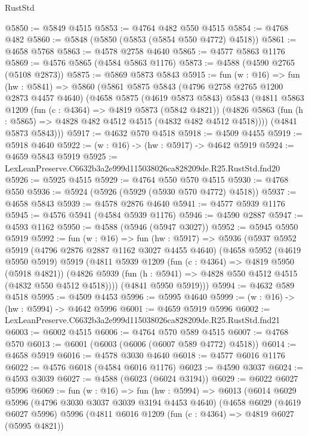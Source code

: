 \begin{lexlean}{RustStd}
\begin{coremodule}
@5850 := @5849 @4515
@5853 := @4764 @482 @550 @4515
@5854 := @4768 @482
@5860 := @5848 (@5850 (@5853 (@5854 @550 @4772) @4518))
@5861 := @4658 @5768
@5863 := @4578 @2758 @4640
@5865 := @4577 @5863 @1176
@5869 := @4576 @5865 (@4584 @5863 @1176)
@5873 := @4588 (@4590 @2765 (@5108 @2873))
@5875 := @5869 @5873 @5843
@5915 := fun (w : @16) =>
  fun (hw : @5841) =>
  @5860
    (@5861
      @5875
      @5843
      (@4796 @2758 @2765 @1200 @2873 @4457 @4640)
      (@4658
        @5875
        (@4619 @5873 @5843)
        @5843
        (@4811
          @5863
          @1209
          (fun (c : @4364) => @4819 @5873 (@5842 @4821))
          (@4826 @5863 (fun (h : @5865) => @4828 @482 @4512 @4515 (@4832 @482 @4512 @4518))))
        (@4841 @5873 @5843)))
@5917 := @4632 @570 @4518
@5918 := @4509 @4455
@5919 := @5918 @4640
@5922 := (w : @16) -> (hw : @5917) -> @4642 @5919
@5924 := @4659 @5843 @5919
@5925 := LexLeanPreserve.C6632b3a2e999d115038026ca828209de.R25.RustStd.fnd20
@5926 := @5925 @4515
@5929 := @4764 @550 @570 @4515
@5930 := @4768 @550
@5936 := @5924 (@5926 (@5929 (@5930 @570 @4772) @4518))
@5937 := @4658 @5843
@5939 := @4578 @2876 @4640
@5941 := @4577 @5939 @1176
@5945 := @4576 @5941 (@4584 @5939 @1176)
@5946 := @4590 @2887
@5947 := @4593 @1162
@5950 := @4588 (@5946 (@5947 @3027))
@5952 := @5945 @5950 @5919
@5992 := fun (w : @16) =>
  fun (hw : @5917) =>
  @5936
    (@5937
      @5952
      @5919
      (@4796 @2876 @2887 @1162 @3027 @4455 @4640)
      (@4658
        @5952
        (@4619 @5950 @5919)
        @5919
        (@4811
          @5939
          @1209
          (fun (c : @4364) => @4819 @5950 (@5918 @4821))
          (@4826 @5939 (fun (h : @5941) => @4828 @550 @4512 @4515 (@4832 @550 @4512 @4518))))
        (@4841 @5950 @5919)))
@5994 := @4632 @589 @4518
@5995 := @4509 @4453
@5996 := @5995 @4640
@5999 := (w : @16) -> (hw : @5994) -> @4642 @5996
@6001 := @4659 @5919 @5996
@6002 := LexLeanPreserve.C6632b3a2e999d115038026ca828209de.R25.RustStd.fnd21
@6003 := @6002 @4515
@6006 := @4764 @570 @589 @4515
@6007 := @4768 @570
@6013 := @6001 (@6003 (@6006 (@6007 @589 @4772) @4518))
@6014 := @4658 @5919
@6016 := @4578 @3030 @4640
@6018 := @4577 @6016 @1176
@6022 := @4576 @6018 (@4584 @6016 @1176)
@6023 := @4590 @3037
@6024 := @4593 @3039
@6027 := @4588 (@6023 (@6024 @3194))
@6029 := @6022 @6027 @5996
@6069 := fun (w : @16) =>
  fun (hw : @5994) =>
  @6013
    (@6014
      @6029
      @5996
      (@4796 @3030 @3037 @3039 @3194 @4453 @4640)
      (@4658
        @6029
        (@4619 @6027 @5996)
        @5996
        (@4811
          @6016
          @1209
          (fun (c : @4364) => @4819 @6027 (@5995 @4821))

\end{coremodule}
\end{lexlean}
